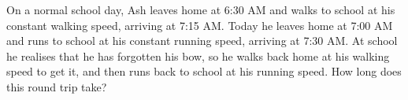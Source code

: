 On a normal school day, Ash leaves home at 6:30 AM and walks to school at his constant walking speed, arriving at 7:15 AM. Today he leaves home at 7:00 AM and runs to school at his constant running speed, arriving at 7:30 AM. At school he realises that he has forgotten his bow, so he walks back home at his walking speed to get it, and then runs back to school at his running speed. How long does this round trip take?
